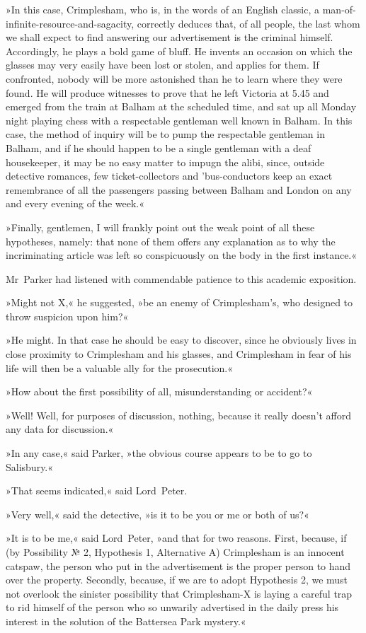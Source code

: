 »In this case, Crimplesham, who is, in the words of an English classic, a man-of-infinite-resource-and-sagacity, correctly deduces that, of all people, the last whom we shall expect to find answering our advertisement is the criminal himself. Accordingly, he plays a bold game of bluff. He invents an occasion on which the glasses may very easily have been lost or stolen, and applies for them. If confronted, nobody will be more astonished than he to learn where they were found. He will produce witnesses to prove that he left Victoria at 5.45 and emerged from the train at Balham at the scheduled time, and sat up all Monday night playing chess with a respectable gentleman well known in Balham. In this case, the method of inquiry will be to pump the respectable gentleman in Balham, and if he should happen to be a single gentleman with a deaf housekeeper, it may be no easy matter to impugn the alibi, since, outside detective romances, few ticket-collectors and 'bus-conductors keep an exact remembrance of all the passengers passing between Balham and London on any and every evening of the week.«

»Finally, gentlemen, I will frankly point out the weak point of all these hypotheses, namely: that none of them offers any explanation as to why the incriminating article was left so conspicuously on the body in the first instance.«

Mr~Parker had listened with commendable patience to this academic exposition.

»Might not X,« he suggested, »be an enemy of Crimplesham's, who designed to throw suspicion upon him?«

»He might. In that case he should be easy to discover, since he obviously lives in close proximity to Crimplesham and his glasses, and Crimplesham in fear of his life will then be a valuable ally for the prosecution.«

»How about the first possibility of all, misunderstanding or accident?«

»Well! Well, for purposes of discussion, nothing, because it really doesn't afford any data for discussion.«

»In any case,« said Parker, »the obvious course appears to be to go to Salisbury.«

»That seems indicated,« said Lord~Peter.

»Very well,« said the detective, »is it to be you or me or both of us?«

»It is to be me,« said Lord~Peter, »and that for two reasons. First, because, if (by Possibility № 2, Hypothesis 1, Alternative A) Crimplesham is an innocent catspaw, the person who put in the advertisement is the proper person to hand over the property. Secondly, because, if we are to adopt Hypothesis 2, we must not overlook the sinister possibility that Crimplesham-X is laying a careful trap to rid himself of the person who so unwarily advertised in the daily press his interest in the solution of the Battersea Park mystery.«

